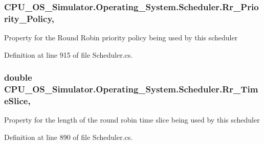 \subsubsection[{Rr\+\_\+\+Priority\+\_\+\+Policy}]{ C\+P\+U\+\_\+\+O\+S\+\_\+\+Simulator.\+Operating\+\_\+\+System.\+Scheduler.\+Rr\+\_\+\+Priority\+\_\+\+Policy\hspace{0.3cm}{\ttfamily [get]}, {\ttfamily [set]}}\label{class_c_p_u___o_s___simulator_1_1_operating___system_1_1_scheduler_aadb6b79c667cfd6baef113c44fb98f9e}


Property for the Round Robin priority policy being used by this scheduler 



Definition at line 915 of file Scheduler.\+cs.

\hypertarget{class_c_p_u___o_s___simulator_1_1_operating___system_1_1_scheduler_ab21e8ffe8d0f06388cc2310d3dbb3b48}{}
\subsubsection[{Rr\+\_\+\+Time\+Slice}]{\setlength{\rightskip}{0pt plus 5cm}double C\+P\+U\+\_\+\+O\+S\+\_\+\+Simulator.\+Operating\+\_\+\+System.\+Scheduler.\+Rr\+\_\+\+Time\+Slice\hspace{0.3cm}{\ttfamily [get]}, {\ttfamily [set]}}\label{class_c_p_u___o_s___simulator_1_1_operating___system_1_1_scheduler_ab21e8ffe8d0f06388cc2310d3dbb3b48}


Property for the length of the round robin time slice being used by this scheduler 



Definition at line 890 of file Scheduler.\+cs.

\hypertarget{class_c_p_u___o_s___simulator_1_1_operating___system_1_1_scheduler_acc7c4b6c0383e4cf1a65251335f44e6d}{}
